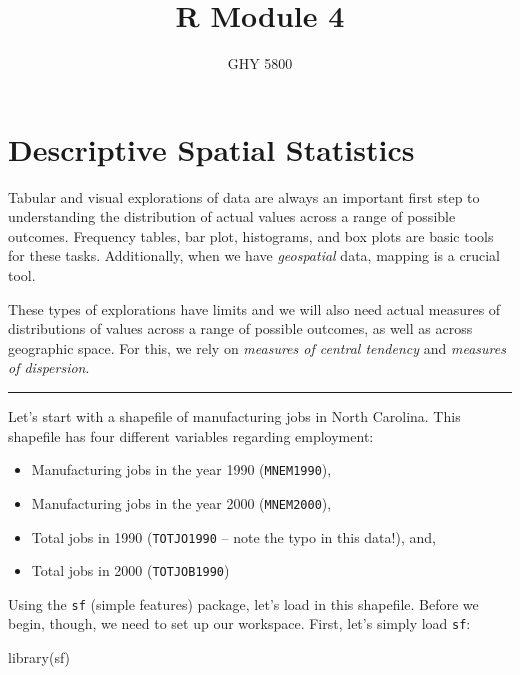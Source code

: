 \documentclass[
]{article}
\title{R Module 4}
\author{GHY 5800}
\date{}
\newenvironment{Shaded}{\begin{snugshade}}{\end{snugshade}}
\newcommand{\FunctionTok}[1]{\textcolor[rgb]{0.00,0.00,0.00}{#1}}
\newcommand{\NormalTok}[1]{#1}
\begin{document}
\maketitle

\hypertarget{descriptive-spatial-statistics}{%
\section{Descriptive Spatial
Statistics}\label{descriptive-spatial-statistics}}

Tabular and visual explorations of data are always an important first
step to understanding the distribution of actual values across a range
of possible outcomes. Frequency tables, bar plot, histograms, and box
plots are basic tools for these tasks. Additionally, when we have
\emph{geospatial} data, mapping is a crucial tool.

These types of explorations have limits and we will also need actual
measures of distributions of values across a range of possible outcomes,
as well as across geographic space. For this, we rely on \emph{measures
of central tendency} and \emph{measures of dispersion}.

\begin{center}\rule{0.5\linewidth}{0.5pt}\end{center}

Let's start with a shapefile of manufacturing jobs in North Carolina.
This shapefile has four different variables regarding employment:

\begin{itemize}
\item
  Manufacturing jobs in the year 1990 (\texttt{MNEM1990}),
\item
  Manufacturing jobs in the year 2000 (\texttt{MNEM2000}),
\item
  Total jobs in 1990 (\texttt{TOTJO1990} -- note the typo in this
  data!), and,
\item
  Total jobs in 2000 (\texttt{TOTJOB1990})
\end{itemize}

Using the \texttt{sf} (simple features) package, let's load in this
shapefile. Before we begin, though, we need to set up our workspace.
First, let's simply load \texttt{sf}:

\begin{Shaded}
\begin{Highlighting}[]
\FunctionTok{library}\NormalTok{(sf)}
\end{Highlighting}
\end{Shaded}
\end{document}
